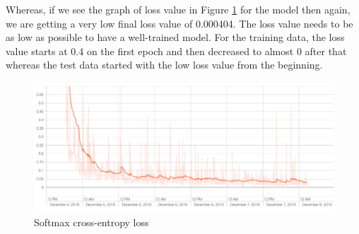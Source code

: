 Whereas, if we see the graph of loss value in Figure \ref{fig:loss} for the model then again, we are getting a very low final loss value of 0.000404. The loss value needs to be as low as possible to have a well-trained model. For the training data, the loss value starts at 0.4 on the first epoch and then decreased to almost 0 after that whereas the test data started with the low loss value from the beginning.

\begin{figure}[H]
  \centering
  \includegraphics[scale=0.40]{images/Chapter5/loss.png}
  \caption{Softmax cross-entropy loss}
  \label{fig:loss}
\end{figure}


